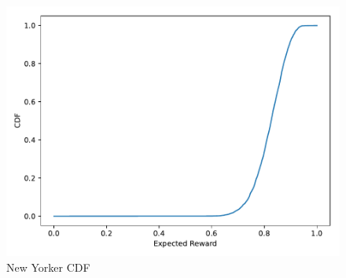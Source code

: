 \begin{figure}
\includegraphics[width=\textwidth]{fixedbudget/figures/NY_CDF.pdf}
\caption{New Yorker CDF}
\label{fig:newyorkercdf}
\end{figure}
